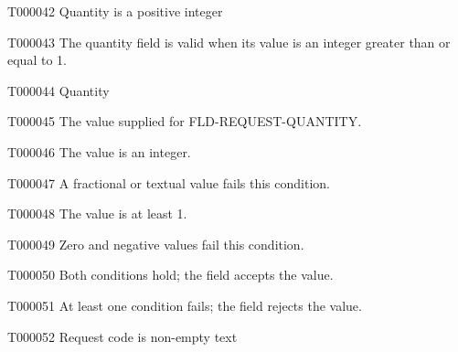 \documentclass[11pt,a4paper]{article}
\begin{document}
\begin{atlastext}{T000042}
Quantity is a positive integer
\end{atlastext}
\begin{atlasparagraph}{T000043}
The quantity field is valid when its value is an integer greater than or equal to 1.
\end{atlasparagraph}
\begin{atlastext}{T000044}
Quantity
\end{atlastext}
\begin{atlasparagraph}{T000045}
The value supplied for FLD-REQUEST-QUANTITY.
\end{atlasparagraph}
\begin{atlastext}{T000046}
The value is an integer.
\end{atlastext}
\begin{atlasparagraph}{T000047}
A fractional or textual value fails this condition.
\end{atlasparagraph}
\begin{atlastext}{T000048}
The value is at least 1.
\end{atlastext}
\begin{atlasparagraph}{T000049}
Zero and negative values fail this condition.
\end{atlasparagraph}
\begin{atlasparagraph}{T000050}
Both conditions hold; the field accepts the value.
\end{atlasparagraph}
\begin{atlasparagraph}{T000051}
At least one condition fails; the field rejects the value.
\end{atlasparagraph}
\begin{atlastext}{T000052}
Request code is non-empty text
\end{atlastext}
\end{document}
